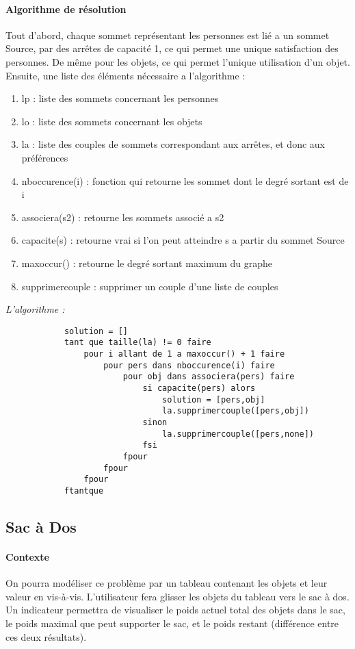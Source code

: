 		\paragraph{Algorithme de résolution}
			Tout d'abord, chaque sommet représentant les personnes est lié a un sommet
			 Source, par des arrêtes de capacité 1, ce qui permet une unique satisfaction
			 des personnes.
			De même pour les objets, ce qui permet l'unique utilisation d'un objet.
			Ensuite, une liste des éléments nécessaire a l'algorithme :
		        \begin{enumerate}
		        	\item lp : liste des sommets concernant les personnes
		        	\item lo : liste des sommets concernant les objets
				\item la : liste des couples de sommets correspondant aux arrêtes, et donc aux préférences
				\item nboccurence(i) : fonction qui retourne les sommet dont le degré sortant est de i
				\item associera(s2) : retourne les sommets associé a s2
				\item capacite(s) : retourne vrai si l'on peut atteindre s a partir du sommet Source
				\item maxoccur() : retourne le degré sortant maximum du graphe
				\item supprimercouple : supprimer un couple d'une liste de couples
            		\end{enumerate}

			\emph{L'algorithme :}

			\begin{lstlisting}
			solution = []
			tant que taille(la) != 0 faire
				pour i allant de 1 a maxoccur() + 1 faire
					pour pers dans nboccurence(i) faire
						pour obj dans associera(pers) faire
							si capacite(pers) alors
								solution = [pers,obj] 
								la.supprimercouple([pers,obj])
							sinon
								la.supprimercouple([pers,none])
							fsi
						fpour
					fpour
				fpour
			ftantque
			\end{lstlisting}

				



    \subsection{Sac à Dos}
        \paragraph{Contexte}
        On pourra modéliser ce problème par un tableau contenant les objets et leur
        valeur en vis-à-vis. L'utilisateur fera glisser les objets du tableau vers
        le sac à dos. Un indicateur permettra de visualiser le poids actuel total
        des objets dans le sac, le poids maximal que peut supporter le sac, et le
        poids restant (différence entre ces deux résultats).

